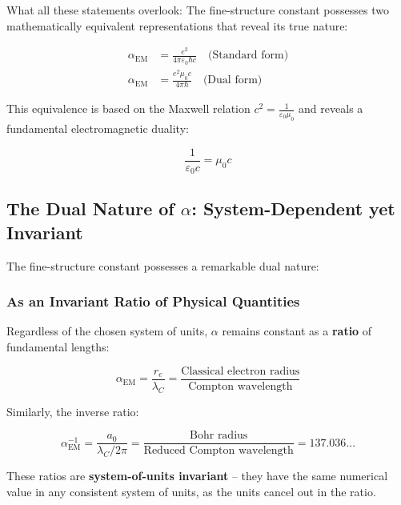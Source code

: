 What all these statements overlook: The fine-structure constant possesses two mathematically equivalent representations that reveal its true nature:

\begin{align}
	\alpha_{\text{EM}} &= \frac{e^2}{4\pi\varepsilon_0\hbar c} \quad \text{(Standard form)} \label{eq:alpha_standard}\\
	\alpha_{\text{EM}} &= \frac{e^2 \mu_0 c}{4\pi \hbar} \quad \text{(Dual form)} \label{eq:alpha_dual}
\end{align}

This equivalence is based on the Maxwell relation $c^2 = \frac{1}{\varepsilon_0\mu_0}$ and reveals a fundamental electromagnetic duality:

\begin{equation}
	\frac{1}{\varepsilon_0 c} = \mu_0 c
	\label{eq:em_duality}
\end{equation}

\subsection{The Dual Nature of $\alpha$: System-Dependent yet Invariant}
\label{subsec:double_nature}

The fine-structure constant possesses a remarkable dual nature:

\subsubsection{As an Invariant Ratio of Physical Quantities}
\label{subsubsec:invariant_ratio}

Regardless of the chosen system of units, $\alpha$ remains constant as a \textbf{ratio} of fundamental lengths:

\begin{equation}
	\alpha_{\text{EM}} = \frac{r_e}{\lambda_C} = \frac{\text{Classical electron radius}}{\text{Compton wavelength}}
	\label{eq:alpha_ratio_re}
\end{equation}

Similarly, the inverse ratio:

\begin{equation}
	\alpha_{\text{EM}}^{-1} = \frac{a_0}{\lambda_C/2\pi} = \frac{\text{Bohr radius}}{\text{Reduced Compton wavelength}} = 137.036...
	\label{eq:alpha_ratio_bohr}
\end{equation}

These ratios are \textbf{system-of-units invariant} -- they have the same numerical value in any consistent system of units, as the units cancel out in the ratio.

